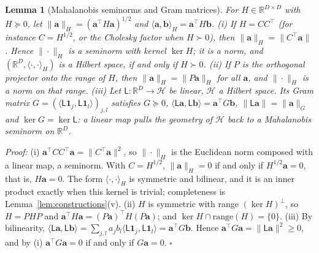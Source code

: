 \documentclass{article}
\newcommand{\RR}{\mathbb{R}}
\newcommand{\bb}{\mathbf{b}}
\newcommand{\ba}{\mathbf{a}}
\theoremstyle{plain}
\newtheorem{lemma}[theorem]{Lemma}
\theoremstyle{remark}
\begin{document}
\begin{lemma}[Mahalanobis seminorms and Gram matrices]\label{lem:mahalanobis_basics}
For $H\in\RR^{D\times D}$ with $H\succeq0$, let $\|\ba\|_H=(\ba^\top H\ba)^{1/2}$ and $\langle\ba,\bb\rangle_H=\ba^\top H\bb$.
(i) If $H=CC^\top$ (for instance $C=H^{1/2}$, or the Cholesky factor when $H\succ0$), then $\|\ba\|_H=\|C^\top\ba\|$. Hence $\|\cdot\|_H$ is a seminorm
with kernel $\ker H$; it is a norm, and $(\RR^D,\langle\cdot,\cdot\rangle_H)$ is a Hilbert space, if and only if $H\succ0$.
(ii) If $P$ is the orthogonal projector onto the range of $H$, then $\|\ba\|_H=\|P\ba\|_H$ for all $\ba$, and $\|\cdot\|_H$ is a norm on that range.
(iii) Let $\mathsf L:\RR^D\to\mathcal H$ be linear, $\mathcal H$ a Hilbert space. Its \emph{Gram matrix}
$G=(\langle\mathsf L\mathbf 1_j,\mathsf L\mathbf 1_l\rangle)_{j,l}$ satisfies $G\succeq0$, $\langle\mathsf L\ba,\mathsf L\bb\rangle=\ba^\top G\bb$, $\|\mathsf L\ba\|=\|\ba\|_G$
and $\ker G=\ker\mathsf L$: a linear map pulls the geometry of $\mathcal H$ back to a Mahalanobis seminorm on $\RR^D$.
\end{lemma}
\textit{Proof:}
(i) $\ba^\top CC^\top\ba=\|C^\top\ba\|^2$, so $\|\cdot\|_H$ is the Euclidean norm composed with a linear map, a seminorm. With $C=H^{1/2}$,
$\|\ba\|_H=0$ if and only if $H^{1/2}\ba=0$, that is, $H\ba=0$. The form $\langle\cdot,\cdot\rangle_H$ is symmetric and bilinear, and it is an inner
product exactly when this kernel is trivial; completeness is Lemma~\ref{lem:constructions}(v).
(ii) $H$ is symmetric with range $(\ker H)^\perp$, so $H=PHP$ and $\ba^\top H\ba=(P\ba)^\top H(P\ba)$; and $\ker H\cap\mathrm{range}(H)=\{0\}$.
(iii) By bilinearity, $\langle\mathsf L\ba,\mathsf L\bb\rangle=\sum_{j,l}a_jb_l\langle\mathsf L\mathbf 1_j,\mathsf L\mathbf 1_l\rangle=\ba^\top G\bb$. Hence
$\ba^\top G\ba=\|\mathsf L\ba\|^2\ge0$, and by (i) $\ba^\top G\ba=0$ if and only if $G\ba=0$. \hfill$\square$
\end{document}
